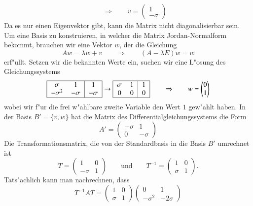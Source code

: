 \begin{beispiel}
\begin{align*}
\qquad\Rightarrow\qquad
v=
\begin{pmatrix}
1\\-\sigma
\end{pmatrix}
\end{align*}
Da es nur einen Eigenvektor gibt, kann die Matrix nicht diagonalisierbar
sein.
Um eine Basis zu konstruieren, in welcher die Matrix Jordan-Normalform
bekommt, brauchen wir eine Vektor $w$, der die Gleichung
\[
Aw = \lambda w + v
\qquad\Rightarrow\qquad
(A-\lambda E)w=w
\]
erf"ullt.
Setzen wir die bekannten Werte ein, suchen wir eine L"osung des
Gleichungssystems
\[
\begin{tabular}{|>{$}c<{$}>{$}c<{$}|>{$}c<{$}|}
\hline
 \sigma  &    1    & 1 \\
-\sigma^2& -\sigma & -\sigma\\
\hline
\end{tabular}
\rightarrow
\begin{tabular}{|>{$}c<{$}>{$}c<{$}|>{$}c<{$}|}
\hline
 \sigma  &    1    & 1 \\
     0   &    0    & 0 \\
\hline
\end{tabular}
\qquad
\Rightarrow
\qquad
w=\begin{pmatrix}
0\\1
\end{pmatrix}
\]
wobei wir f"ur die frei w"ahlbare zweite Variable den Wert $1$ gew"ahlt haben.
In der Basis $B'=\{v, w\}$ hat die Matrix des Differentialgleichungssystems
die Form
\[
A'
=
\begin{pmatrix}
-\sigma&      1\\
      0&-\sigma 
\end{pmatrix}
\]
Die Transformationsmatrix, die von der Standardbasis in die Basis $B'$
%
umrechnet ist
\[
T
=
\begin{pmatrix}
      1&0\\
-\sigma&1
\end{pmatrix}
\qquad\text{und}\qquad
T^{-1}
=
\begin{pmatrix}
     1&0\\
\sigma&1
\end{pmatrix}.
\]
Tats"achlich kann man nachrechnen, dass
\[
T^{-1}AT
=
\begin{pmatrix}
     1&0\\
\sigma&1
\end{pmatrix}
\begin{pmatrix}
0&1\\
-\sigma^2&-2\sigma
\end{pmatrix}
\]
\end{beispiel}
